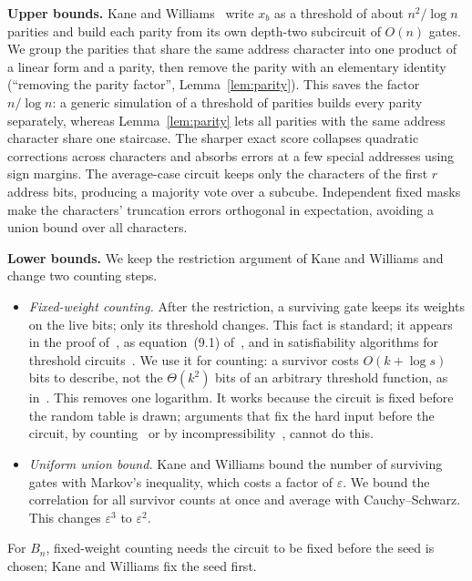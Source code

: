 \documentclass[11pt,letterpaper]{article}
\theoremstyle{remark}
\newcommand{\smalltitle}[1]{\textbf{\color{ink}#1}\quad}
\begin{document}
\smalltitle{Upper bounds.}
Kane and Williams~\cite[Thm.~1.2]{KW} write $x_b$ as a threshold of about
$n^2/\log n$ parities and build each parity from its own depth-two
subcircuit of $O(n)$ gates. We group the parities that share the same
address character into one product of a linear form and a parity, then
remove the parity with an elementary identity (``removing the parity
factor'', Lemma~\ref{lem:parity}). This saves the factor $n/\log n$: a
generic simulation of a threshold of parities builds every parity separately,
whereas Lemma~\ref{lem:parity} lets all parities with the same address
character share one staircase. The sharper exact score collapses quadratic
corrections across characters and absorbs errors at a few special addresses
using sign margins. The average-case circuit keeps only the characters of
the first $r$ address bits, producing a majority vote over a subcube.
Independent fixed masks make the characters' truncation errors orthogonal
in expectation, avoiding a union bound over all characters.

\smalltitle{Lower bounds.}
We keep the restriction argument of Kane and Williams and change two counting
steps.
\begin{itemize}
\item \emph{Fixed-weight counting.} After the restriction, a surviving gate
      keeps its weights on the live bits; only its threshold changes. This
      fact is standard; it appears in the proof of~\cite[Lemma~1.1]{KW}, as
      equation~(9.1) of~\cite{CSS}, and in satisfiability algorithms for
      threshold circuits~\cite{CTW}. We use it for counting: a survivor costs
      $O(k+\log s)$ bits to describe, not the $\Theta(k^2)$ bits of an
      arbitrary threshold function, as in~\cite{KW,KKL,CSS}. This removes one
      logarithm. It works because the circuit is fixed before the random table
      is drawn; arguments that fix the hard input before the circuit, by
      counting~\cite{KW,CSS} or by incompressibility~\cite{KKL}, cannot do
      this.
\item \emph{Uniform union bound.} Kane and Williams bound the number of
      surviving gates with Markov's inequality, which costs a factor of
      $\varepsilon$. We bound the correlation for all survivor counts at
      once and average with Cauchy--Schwarz. This changes $\varepsilon^3$
      to $\varepsilon^2$.
\end{itemize}
For $B_n$, fixed-weight counting needs the circuit to be fixed before the
seed is chosen; Kane and Williams fix the seed first.
\end{document}
